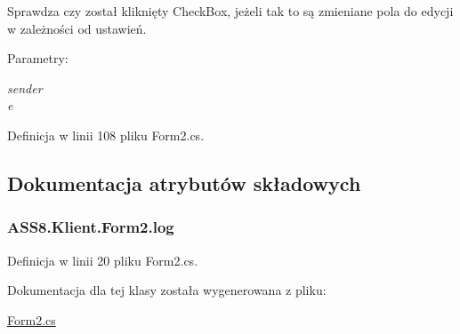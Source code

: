 Sprawdza czy został kliknięty CheckBox, jeżeli tak to są zmieniane pola do edycji w zależności od ustawień. 

\begin{Desc}
\item[Parametry:]
\begin{description}
\item[{\em sender}]\item[{\em e}]\end{description}
\end{Desc}


Definicja w linii 108 pliku Form2.cs.

\subsection{Dokumentacja atrybutów składowych}
\hypertarget{a00004_e630ae8595038e00daa6a1f42b134b59}{
\subsubsection[{log}]{ {\bf ASS8.Klient.Form2.log}}}
\label{d0/d0b/a00004_e630ae8595038e00daa6a1f42b134b59}




Definicja w linii 20 pliku Form2.cs.

Dokumentacja dla tej klasy została wygenerowana z pliku:\begin{CompactItemize}
\item 
\hyperlink{a00043}{Form2.cs}\end{CompactItemize}
